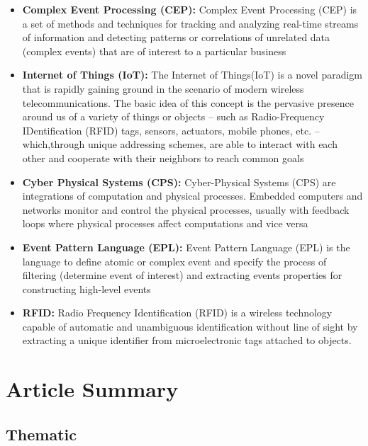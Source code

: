 \documentclass{article}
\begin{document}
\begin{itemize}
    \item \textbf{Complex Event Processing (CEP):} Complex Event Processing (CEP) is a set of methods and techniques for tracking
and analyzing real-time streams of information and detecting patterns or correlations
of unrelated data (complex events) that are of interest to a particular
business \cite{1}

	\item \textbf{Internet of Things (IoT):} The Internet of Things(IoT) is a novel paradigm that is rapidly gaining ground in the scenario of modern wireless telecommunications. The basic idea of this concept is the pervasive presence around us of a variety of things or objects – such as Radio-Frequency IDentification (RFID) tags, sensors, actuators, mobile phones, etc. – which,through unique addressing schemes, are able to interact with each other and cooperate with their neighbors to reach common goals \cite{2}
	
	\item \textbf{Cyber Physical Systems (CPS):} Cyber-Physical Systems (CPS) are integrations of computation and physical processes. Embedded computers and networks monitor and control the physical processes, usually with feedback loops where physical processes affect computations and vice versa \cite{5}
	
	\item \textbf{Event Pattern Language (EPL):} Event Pattern Language (EPL) is the language
to define atomic or complex event and specify the process of filtering (determine event of interest) and extracting events properties for constructing high-level events \cite{4}	
	
	\item \textbf{RFID:} Radio Frequency Identification (RFID) is a wireless technology capable of automatic and unambiguous identification without line of sight by extracting a unique identifier from microelectronic tags attached to objects. \cite{3}
\end{itemize}


\section{Article Summary}

\subsection{Thematic}
\end{document}
